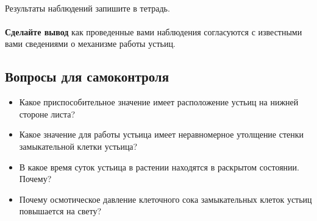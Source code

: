 \paragraph*{}Результаты наблюдений запишите в тетрадь.

\paragraph*{}\textbf{Сделайте вывод} как проведенные вами наблюдения согласуются с известными вами сведениями о механизме работы устьиц.

\subsection*{Вопросы для самоконтроля}

\begin{itemize}
	\item Какое приспособительное значение имеет расположение устьиц на нижней стороне листа?
	\item Какое значение для работы устьица имеет неравномерное утолщение стенки замыкательной клетки устьица?
	\item В какое время суток устьица в растении находятся в раскрытом состоянии. Почему?
	\item Почему осмотическое давление клеточного сока замыкательных клеток устьиц повышается на свету?
\end{itemize}

